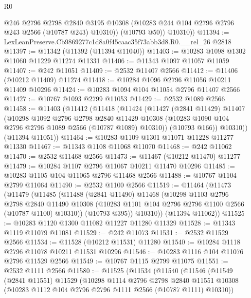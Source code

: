 \begin{lexlean}{R0}
\begin{coremodule}
            @246
            @2796
            @2798
            @2840
            @3195
            @10308
            (@10283 @244 @104 @2796 @2796 @243 @2566 (@10787 @243) @10310))
          (@10793 @50))
        @10310))
@11394 := LexLeanPreserve.Cb9869277c1d8a0f45caac35f73abb3d8.R0.__rel_26 @2818
@11397 := @11342 (@11392 (@11394 @11040))
@11403 := @10283 @1098 @1302 @11060 @11229 @11274 @11331
@11406 := @11343 @1097 @11057 @11059
@11407 := @242 @11051
@11409 := @2532 @11407 @2566
@11412 := @11406 (@10212 @11409) @11274
@11418 := @10284 @1096 @2796 @11056 @10211 @11409 @10296
@11424 := @10283 @1094 @104 @11054 @2796 @11407 @2566
@11427 := @10767 @1093 @2799 @11053
@11429 := @2532 @1089 @2566
@11458 := @11403
    (@11412
      (@11418
        (@11424
          (@11427
            (@2841 @11429)
            @11407
            (@10298
              @1092
              @2796
              @2798
              @2840
              @11429
              @10308
              (@10283 @1090 @104 @2796 @2796 @1089 @2566 (@10787 @1089) @10310))
            (@10793 @166))
          @10310))
      (@11394 @11051))
@11464 := @10283 @1109 @1301 @11071 @11228 @11277 @11330
@11467 := @11343 @1108 @11068 @11070
@11468 := @242 @11062
@11470 := @2532 @11468 @2566
@11473 := @11467 (@10212 @11470) @11277
@11479 := @10284 @1107 @2796 @11067 @10211 @11470 @10296
@11485 := @10283 @1105 @104 @11065 @2796 @11468 @2566
@11488 := @10767 @1104 @2799 @11064
@11490 := @2532 @1100 @2566
@11519 := @11464
    (@11473
      (@11479
        (@11485
          (@11488
            (@2841 @11490)
            @11468
            (@10298
              @1103
              @2796
              @2798
              @2840
              @11490
              @10308
              (@10283 @1101 @104 @2796 @2796 @1100 @2566 (@10787 @1100) @10310))
            (@10793 @395))
          @10310))
      (@11394 @11062))
@11525 := @10283 @1120 @1300 @11082 @11227 @11280 @11329
@11528 := @11343 @1119 @11079 @11081
@11529 := @242 @11073
@11531 := @2532 @11529 @2566
@11534 := @11528 (@10212 @11531) @11280
@11540 := @10284 @1118 @2796 @11078 @10211 @11531 @10296
@11546 := @10283 @1116 @104 @11076 @2796 @11529 @2566
@11549 := @10767 @1115 @2799 @11075
@11551 := @2532 @1111 @2566
@11580 := @11525
    (@11534
      (@11540
        (@11546
          (@11549
            (@2841 @11551)
            @11529
            (@10298
              @1114
              @2796
              @2798
              @2840
              @11551
              @10308
              (@10283 @1112 @104 @2796 @2796 @1111 @2566 (@10787 @1111) @10310))

\end{coremodule}
\end{lexlean}
